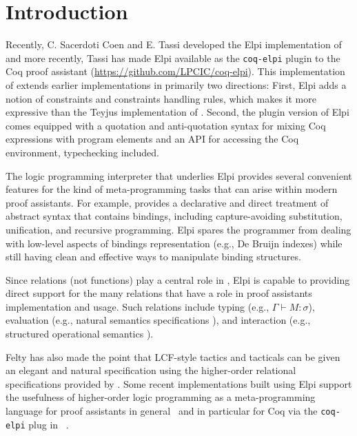 \section{Introduction}
\label{sec:intro}

Recently, C. Sacerdoti Coen and E. Tassi developed the Elpi
implementation \cite{dunchev15lpar} of \lP \cite{miller12proghol} and
more recently, Tassi has made Elpi available as the \texttt{coq-elpi} plugin to the Coq
proof assistant \cite{tassi18coqpl} (\url{https://github.com/LPCIC/coq-elpi}).  This implementation of \lP
extends earlier implementations in primarily two directions:  First,
Elpi adds a notion of constraints and constraints handling rules, which makes it more expressive than
the Teyjus implementation \cite{nadathur99cade} of \lP. Second, the
plugin version of Elpi comes equipped with  a quotation and anti-quotation syntax for mixing
Coq expressions with \lP program elements and an API for accessing the
Coq environment, typechecking included.

The logic programming interpreter that underlies Elpi provides several
convenient features for the kind of meta-programming tasks that can
arise within modern proof assistants.  For example, \lP provides a
declarative and direct treatment of abstract syntax that contains
bindings, including capture-avoiding substitution,
unification, and recursive programming.  Elpi spares the
programmer from dealing with low-level aspects of bindings
representation (e.g., De Bruijn indexes) while still having clean and
effective ways to manipulate binding structures.

Since relations (not functions) play a central role in \lP, Elpi is
capable to providing direct support for the many relations that have a
role in proof assistants implementation and usage.  Such relations include typing (e.g.,
$\Gamma\vdash M\colon\sigma$), evaluation (e.g., natural semantics
specifications \cite{kahn87stacs,hannan93jfp}), and interaction (e.g.,
structured operational semantics \cite{plotkin81,milner89book}).

Felty has also
made the point that LCF-style tactics and tacticals can be given an
elegant and natural specification using the higher-order relational
specifications provided by \lP \cite{felty93jar}.  Some recent
implementations built using Elpi
support the usefulness of
higher-order logic programming as a meta-programming language 
for proof assistants in general~\cite{DunchevCT16,coen19mscs} and in particular
for Coq via the \texttt{coq-elpi} plug in~\cite{tassi19itp,CohenST20} .
%


